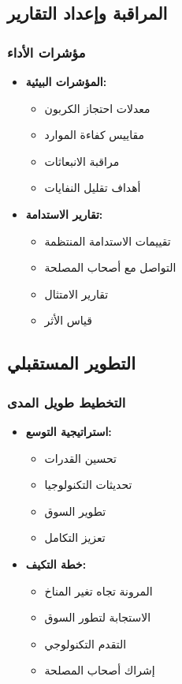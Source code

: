 \subsection{المراقبة وإعداد التقارير}

\subsubsection{مؤشرات الأداء}
\begin{itemize}
    \item \textbf{المؤشرات البيئية:}
    \begin{itemize}
        \item معدلات احتجاز الكربون
        \item مقاييس كفاءة الموارد
        \item مراقبة الانبعاثات
        \item أهداف تقليل النفايات
    \end{itemize}
    
    \item \textbf{تقارير الاستدامة:}
    \begin{itemize}
        \item تقييمات الاستدامة المنتظمة
        \item التواصل مع أصحاب المصلحة
        \item تقارير الامتثال
        \item قياس الأثر
    \end{itemize}
\end{itemize}

\subsection{التطوير المستقبلي}

\subsubsection{التخطيط طويل المدى}
\begin{itemize}
    \item \textbf{استراتيجية التوسع:}
    \begin{itemize}
        \item تحسين القدرات
        \item تحديثات التكنولوجيا
        \item تطوير السوق
        \item تعزيز التكامل
    \end{itemize}
    
    \item \textbf{خطة التكيف:}
    \begin{itemize}
        \item المرونة تجاه تغير المناخ
        \item الاستجابة لتطور السوق
        \item التقدم التكنولوجي
        \item إشراك أصحاب المصلحة
    \end{itemize}
\end{itemize}
